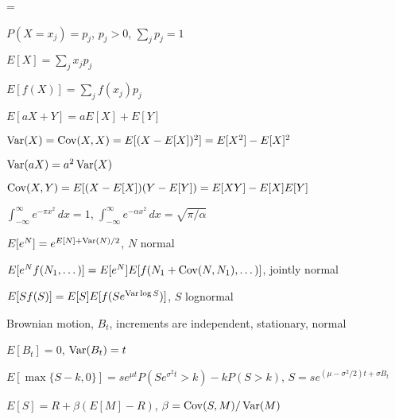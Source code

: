 \magnification=
\def\Var{\mathop{\rm Var}\nolimits}
\def\Cov{\mathop{\rm Cov}\nolimits}

$P(X = x_j) = p_j$, $p_j > 0$, $\sum_j p_j = 1$

$E[X] = \sum_j x_j p_j$

$E[f(X)] = \sum_j f(x_j) p_j$

$E[aX + Y] = aE[X] + E[Y]$

$\Var(X) = \Cov(X, X) = E[(X - E[X])^2] = E[X^2] - E[X]^2$

$\Var(aX) = a^2\Var(X)$

$\Cov(X, Y) = E[(X - E[X])(Y - E[Y]) = E[XY] - E[X]E[Y]$

$\int_{-\infty}^\infty e^{-\pi x^2}\,dx = 1$,
$\int_{-\infty}^\infty e^{-\alpha x^2}\,dx = \sqrt{\pi/\alpha}$

$E[e^N] = e^{E[N] + \Var(N)/2}$, $N$ normal

$E[e^N f(N_1,\dots)] = E[e^N] E[f(N_1 + \Cov(N, N_1),\dots)]$, jointly normal

$E[S f(S)] = E[S] E[f(Se^{\Var\log S})]$, $S$ lognormal

Brownian motion, $B_t$, increments are independent, stationary, normal

$E[B_t] = 0$, $\Var(B_t) = t$

$E[\max\{S - k, 0\}] = se^{\mu t}P(Se^{\sigma^2 t} > k) - kP(S > k)$,
$S = se^{(\mu - \sigma^2/2) t + \sigma B_t}$

$E[S] = R + \beta(E[M] - R)$, $\beta = \Cov(S, M)/\Var(M)$

\bye
